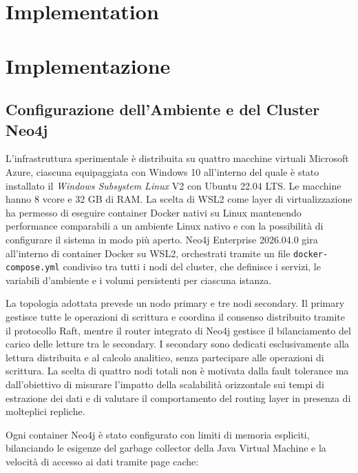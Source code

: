 {\chapter{Implementation}}
{\chapter{Implementazione}}
\label{sec:implementation}

\vspace{-10pt}
\section{Configurazione dell'Ambiente e del Cluster Neo4j}

L'infrastruttura sperimentale è distribuita su quattro macchine virtuali Microsoft Azure, ciascuna equipaggiata con Windows 10 all'interno del quale è stato installato il \textit{Windows Subsystem Linux} V2 con Ubuntu 22.04 LTS. Le macchine hanno 8 vcore e 32 GB di RAM. La scelta di WSL2 come layer di virtualizzazione ha permesso di eseguire container Docker nativi su Linux mantenendo performance comparabili a un ambiente Linux nativo e con la possibilità di configurare il sistema in modo più aperto. Neo4j Enterprise 2026.04.0 gira all'interno di container Docker su WSL2, orchestrati tramite un file \texttt{docker-compose.yml} condiviso tra tutti i nodi del cluster, che definisce i servizi, le variabili d'ambiente e i volumi persistenti per ciascuna istanza.

La topologia adottata prevede un nodo primary e tre nodi secondary. Il primary gestisce tutte le operazioni di scrittura e coordina il consenso distribuito tramite il protocollo Raft, mentre il router integrato di Neo4j gestisce il bilanciamento del carico delle letture tra le secondary. I secondary sono dedicati esclusivamente alla lettura distribuita e al calcolo analitico, senza partecipare alle operazioni di scrittura. La scelta di quattro nodi totali non è motivata dalla fault tolerance ma dall'obiettivo di misurare l'impatto della scalabilità orizzontale sui tempi di estrazione dei dati e di valutare il comportamento del routing layer in presenza di molteplici repliche.

Ogni container Neo4j è stato configurato con limiti di memoria espliciti, bilanciando le esigenze del garbage collector della Java Virtual Machine e la velocità di accesso ai dati tramite page cache:

